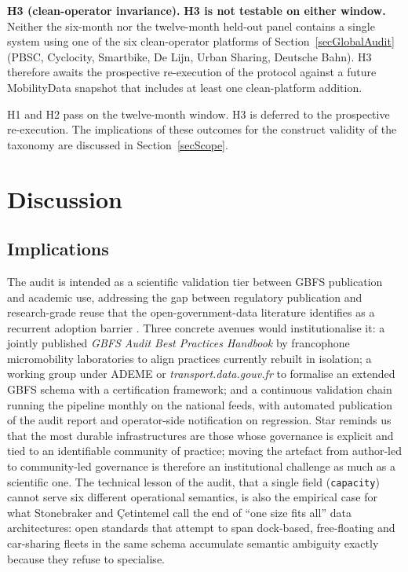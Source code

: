 \documentclass[11pt,a4paper]{article}
\begin{document}
\textbf{H3 (clean-operator invariance).} \textbf{H3 is not
testable on either window.} Neither the six-month nor the
twelve-month held-out panel contains a single system using one
of the six clean-operator platforms of
Section~\ref{secGlobalAudit} (PBSC, Cyclocity, Smartbike,
De Lijn, Urban Sharing, Deutsche Bahn). H3 therefore awaits
the prospective re-execution of the protocol against a future
MobilityData snapshot that includes at least one clean-platform
addition.

H1 and H2 pass on the twelve-month window. H3 is deferred to the
prospective re-execution. The implications of these outcomes for
the construct validity of the taxonomy are discussed in
Section~\ref{secScope}.

\section{Discussion}\label{secDiscussion}

\subsection{Implications}
The audit is intended as a scientific validation tier between GBFS
publication and academic use, addressing the gap between regulatory
publication and research-grade reuse that the open-government-data
literature identifies as a recurrent adoption barrier
\cite{Janssen2012OpenData}. Three concrete avenues would
institutionalise it: a jointly published \emph{GBFS Audit Best
Practices Handbook} by francophone micromobility laboratories to
align practices currently rebuilt in isolation; a working group
under ADEME or \emph{transport.data.gouv.fr} to formalise an
extended GBFS schema with a certification framework; and a
continuous validation chain running the pipeline monthly on the
national feeds, with automated publication of the audit report and
operator-side notification on regression. Star \cite{Star2010}
reminds us that the most durable infrastructures are those whose
governance is explicit and tied to an identifiable community of
practice; moving the artefact from author-led to community-led
governance is therefore an institutional challenge as much as a
scientific one. The technical lesson of the audit, that a single
field (\texttt{capacity}) cannot serve six different operational
semantics, is also the empirical case for what Stonebraker and
\c{C}etintemel \cite{Stonebraker2005OneSize} call the end of
``one size fits all'' data architectures: open standards that
attempt to span dock-based, free-floating and car-sharing fleets in
the same schema accumulate semantic ambiguity exactly because they
refuse to specialise.
\end{document}
